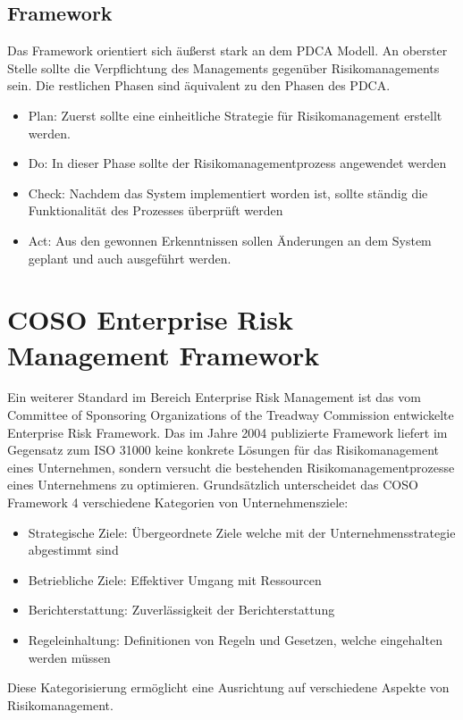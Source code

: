 \documentclass{report}
\begin{document}
\subsection{Framework}
Das Framework orientiert sich äußerst stark an dem PDCA Modell. An oberster Stelle sollte die Verpflichtung des Managements gegenüber Risikomanagements sein. Die restlichen Phasen sind äquivalent zu den Phasen des PDCA.
\begin{itemize}
\item Plan: Zuerst sollte eine einheitliche Strategie für Risikomanagement erstellt werden.
\item Do: In dieser Phase sollte der Risikomanagementprozess angewendet werden
\item Check: Nachdem das System implementiert worden ist, sollte ständig die Funktionalität des Prozesses überprüft werden 
\item Act: Aus den gewonnen Erkenntnissen sollen Änderungen an dem System geplant und auch ausgeführt werden.   
\end{itemize}

\section{COSO Enterprise Risk Management Framework}
Ein weiterer Standard im Bereich Enterprise Risk Management ist das vom Committee of Sponsoring Organizations of the Treadway Commission entwickelte Enterprise Risk Framework. Das im Jahre 2004 publizierte Framework liefert im Gegensatz zum ISO 31000 keine konkrete Lösungen für das Risikomanagement eines Unternehmen, sondern versucht die bestehenden Risikomanagementprozesse eines Unternehmens zu optimieren\cite{COSO}.
\newline
\newline
Grundsätzlich unterscheidet das COSO Framework 4 verschiedene Kategorien von Unternehmensziele:
\begin{itemize}
\item Strategische Ziele: Übergeordnete Ziele welche mit der Unternehmensstrategie abgestimmt sind
\item Betriebliche Ziele: Effektiver Umgang mit Ressourcen
\item Berichterstattung: Zuverlässigkeit der Berichterstattung
\item Regeleinhaltung: Definitionen von Regeln und Gesetzen, welche eingehalten werden müssen  
\end{itemize}

Diese Kategorisierung ermöglicht eine Ausrichtung auf verschiedene Aspekte von Risikomanagement.
\end{document}

